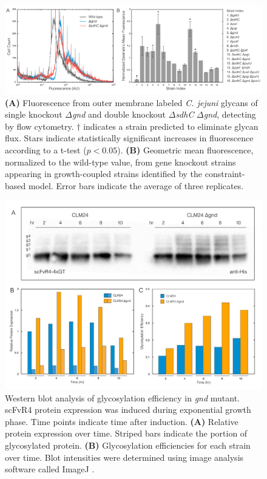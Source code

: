\documentclass[12pt]{article}
\begin{document}
\begin{figure}\centering
\includegraphics[width=1.0\textwidth]{./figures/fig3_FACS_hist.pdf}
\caption{\textbf{(A)} Fluorescence from outer membrane labeled \textit{C. jejuni} glycans of single knockout $\Delta$\textit{gnd} and double knockout $\Delta$\textit{sdhC} $\Delta$\textit{gnd}, detecting by flow cytometry. 
$\dagger$ indicates a strain predicted to eliminate glycan flux. 
Stars indicate statistically significant increases in fluorescence according to a t-test ($p<0.05$). 
\textbf{(B)} Geometric mean fluorescence, normalized to the wild-type value, from gene knockout strains appearing in growth-coupled strains identified by the constraint-based model. 
Error bars indicate the average of three replicates.}
\label{fig_FACS_all}
\end{figure}

\clearpage

\begin{figure}\centering
\includegraphics[width=1.0\textwidth]{./figures/fig4_western_gnd.pdf}
\caption{Western blot analysis of glycosylation efficiency in \textit{gnd} mutant. 
scFvR4 protein expression was induced during exponential growth phase. 
Time points indicate time after induction. 
\textbf{(A)} Relative protein expression over time. 
Striped bars indicate the portion of glycosylated protein. 
\textbf{(B)} Glycosylation efficiencies for each strain over time. 
Blot intensities were determined using image analysis software called ImageJ \cite{2012_schneider_eliceiri_NatMeth}.}
\label{fig_western_CLM24_gnd}
\end{figure}
\end{document}
